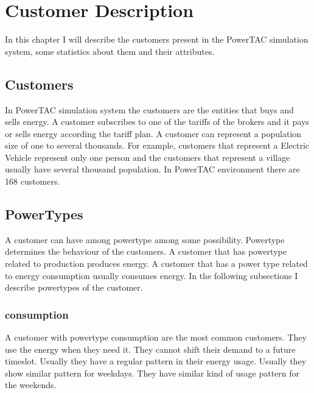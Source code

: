 
\chapter{Customer Description} 

In this chapter I will describe the customers present in the PowerTAC simulation system, some statistics about them and their attributes.

\section{Customers}

In PowerTAC simulation system the customers are the entities that buys and sells energy. A customer subscribes to one of the tariffs of the brokers and it pays or sells energy according the tariff plan. A customer can represent a population size of one to several thousands. For example, customers that represent a Electric Vehicle represent only one person and the customers that represent a village usually have several thousand population. In PowerTAC environment there are 168 customers.

\section {PowerTypes}
A customer can have among powertype among some possibility. Powertype determines the behaviour of the customers. A customer that has powertype related to production produces energy. A customer that has a power type related to energy consumption usually consumes energy. In the following subsections I describe powertypes of the customer.

\subsection{consumption}

A customer with powertype consumption are the most common customers. They use the energy when they need it. They cannot shift their demand to a future timeslot. Usually they have a regular pattern in their energy usage. Usually they show similar pattern for weekdays. They have similar kind of usage pattern for the weekends. 

